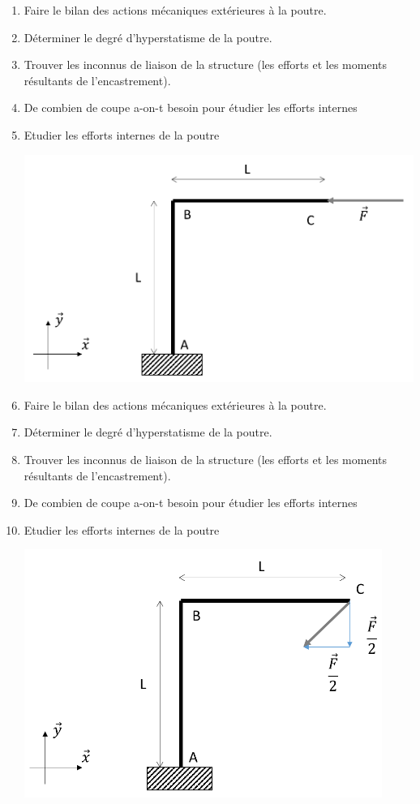 \documentclass[lecture.tex]{subfiles}
\begin{document}
\begin{enumerate}
  \item Faire le bilan des actions mécaniques extérieures à la poutre.
  \item Déterminer le degré d’hyperstatisme de la poutre.
  \item Trouver les inconnus de liaison de la structure (les efforts et les moments résultants de l’encastrement).
  \item De combien de coupe a-on-t besoin pour étudier les efforts internes
  \item Etudier les efforts internes de la poutre

  \begin{center}
    \includegraphics[scale=0.6]{exo-portique-efforts-config2.png}
  \end{center}

  \medskip

  \item Faire le bilan des actions mécaniques extérieures à la poutre.
  \item Déterminer le degré d’hyperstatisme de la poutre.
  \item Trouver les inconnus de liaison de la structure (les efforts et les moments résultants de l’encastrement).
  \item De combien de coupe a-on-t besoin pour étudier les efforts internes
  \item Etudier les efforts internes de la poutre

  \begin{center}
    \includegraphics[scale=0.6]{exo-portique-efforts-config3.png}
  \end{center}


\end{enumerate}
\end{document}
